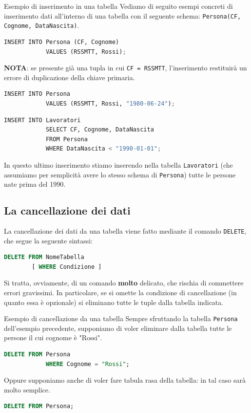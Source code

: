 \documentclass[12pt]{report}
\begin{document}
	\begin{esempio}{Esempio di inserimento in una tabella}{}
		Vediamo di seguito esempi concreti di inserimento dati all'interno di una tabella con il seguente schema: \texttt{Persona(CF, Cognome, DataNascita)}.
		
		\begin{lstlisting}[language=Python, caption={Inserimento specificando la lista degli attributi.}]
			INSERT INTO Persona (CF, Cognome)
			VALUES (RSSMTT, Rossi);
		\end{lstlisting}
		\textbf{NOTA}: se presente già una tupla in cui \texttt{CF = RSSMTT}, l'inserimento restituirà un errore di duplicazione della chiave primaria.
		
		\begin{lstlisting}[language=Python, caption={Inserimento senza specificare la lista degli attributi.}]
			INSERT INTO Persona
			VALUES (RSSMTT, Rossi, "1980-06-24");
		\end{lstlisting}
		
		\begin{lstlisting}[language=Python, caption={Inserimento a partire da query.}]
			INSERT INTO Lavoratori
			SELECT CF, Cognome, DataNascita
			FROM Persona
			WHERE DataNascita < "1990-01-01";
		\end{lstlisting}
		In questo ultimo inserimento stiamo inserendo nella tabella \texttt{Lavoratori} (che assumiamo per semplicità avere lo stesso schema di \texttt{Persona}) tutte le persone nate prima del 1990.
	\end{esempio}
	
	\subsection{La cancellazione dei dati}
	La cancellazione dei dati da una tabella viene fatto mediante il comando \texttt{DELETE}, che segue la seguente sintassi:
	\begin{lstlisting}[language=SQL]
		DELETE FROM NomeTabella
		[ WHERE Condizione ]
	\end{lstlisting}
	Si tratta, ovviamente, di un comando \textbf{molto} delicato, che rischia di commettere errori gravissimi. In particolare, se si omette la condizione di cancellazione (in quanto essa è opzionale) si eliminano tutte le tuple dalla tabella indicata.
	\begin{esempio}{Esempio di cancellazione da una tabella}{}
		Sempre sfruttando la tabella \texttt{Persona} dell'esempio precedente, supponiamo di voler eliminare dalla tabella tutte le persone il cui cognome è "Rossi".
		
		\begin{lstlisting}[language=SQL]
			DELETE FROM Persona
			WHERE Cognome = "Rossi";
		\end{lstlisting}
		
		Oppure supponiamo anche di voler fare tabula rasa della tabella: in tal caso sarà molto semplice.
		\begin{lstlisting}[language=SQL]
			DELETE FROM Persona;
		\end{lstlisting}
	\end{esempio}
	
\end{document}
